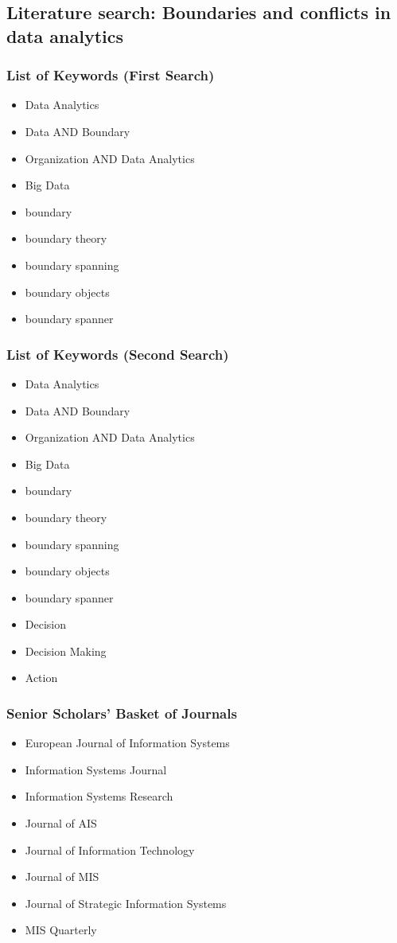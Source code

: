 \subsection*{Literature search: Boundaries and conflicts in data analytics}
\subsubsection*{List of Keywords (First Search)}

\begin{itemize}
    \item Data Analytics
	\item Data AND Boundary
	\item Organization AND Data Analytics
	\item Big Data
	\item boundary 
	\item boundary theory
	\item boundary spanning
	\item boundary objects
    \item boundary spanner
\end{itemize}

\subsubsection*{List of Keywords (Second Search)}

\begin{itemize}
    \item Data Analytics
	\item Data AND Boundary
	\item Organization AND Data Analytics
	\item Big Data
	\item boundary 
	\item boundary theory
	\item boundary spanning
	\item boundary objects
    \item boundary spanner
    \item Decision
    \item Decision Making
    \item Action
\end{itemize}

\subsubsection*{Senior Scholars' Basket of Journals}
\begin{itemize}
    \item European Journal of Information Systems
    \item Information Systems Journal 
    \item Information Systems Research
    \item Journal of AIS
    \item Journal of Information Technology
    \item Journal of MIS
    \item Journal of Strategic Information Systems
    \item MIS Quarterly
\end{itemize}

